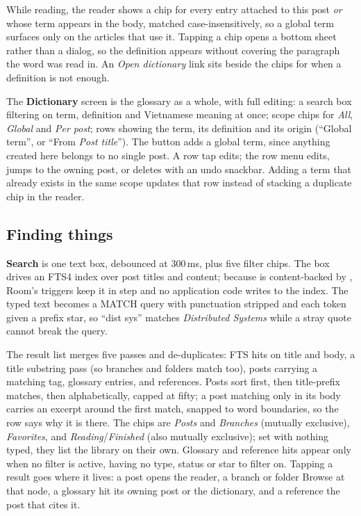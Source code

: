 While reading, the reader shows a chip for every entry attached to this post \emph{or} whose term
appears in the body, matched case-insensitively, so a global term surfaces only on the articles
that use it. Tapping a chip opens a bottom sheet rather than a dialog, so the definition appears
without covering the paragraph the word was read in. An \emph{Open dictionary} link sits beside the
chips for when a definition is not enough.

The \textbf{Dictionary} screen is the glossary as a whole, with full editing: a search box
filtering on term, definition and Vietnamese meaning at once; scope chips for \emph{All},
\emph{Global} and \emph{Per post}; rows showing the term, its definition and its origin (``Global
term'', or ``From \emph{Post title}''). The \code{+} button adds a global term, since anything
created here belongs to no single post. A row tap edits; the row menu edits, jumps to the owning
post, or deletes with an undo snackbar. Adding a term that already exists in the same scope
updates that row instead of stacking a duplicate chip in the reader.

\subsection{Finding things}

\textbf{Search} is one text box, debounced at 300\,ms, plus five filter chips. The box drives an
FTS4 index over post titles and content; because  is content-backed by
, Room's triggers keep it in step and no application code writes to the index. The
typed text becomes a MATCH query with punctuation stripped and each token given a prefix star, so
``dist sys'' matches \emph{Distributed Systems} while a stray quote cannot break the query.

The result list merges five passes and de-duplicates: FTS hits on title and body, a title
substring pass (so branches and folders match too), posts carrying a matching tag, glossary
entries, and references. Posts sort first, then title-prefix matches, then alphabetically, capped
at fifty; a post matching only in its body carries an excerpt around the first match, snapped to
word boundaries, so the row says why it is there. The chips are \emph{Posts} and \emph{Branches}
(mutually exclusive), \emph{Favorites}, and \emph{Reading}/\emph{Finished} (also mutually
exclusive); set with nothing typed, they list the library on their own. Glossary and reference hits
appear only when no filter is active, having no type, status or star to filter on. Tapping a result
goes where it lives: a post opens the reader, a branch or folder Browse at that node, a glossary hit
its owning post or the dictionary, and a reference the post that cites it.

